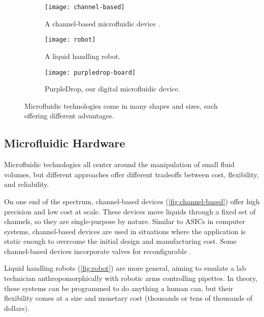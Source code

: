 \documentclass[sigconf, screen]{acmart}
\begin{document}
\begin{figure}
  \centering
  \begin{subfigure}[b]{0.3\linewidth}
    \centering
    \texttt{[image: channel-based]}
    \caption{
      \footnotesize
      A channel-based microfluidic device \cite{channel-img}.
    }
    \label{fig:channel-based}
  \end{subfigure}
  \hfill
  \begin{subfigure}[b]{0.3\linewidth}
    \centering
    \texttt{[image: robot]}
    \caption{
      \footnotesize
      A liquid handling robot.
      \cite{robot-img}
    }
    \label{fig:robot}
  \end{subfigure}
  \hfill
  \begin{subfigure}[b]{0.3\linewidth}
    \centering
    \texttt{[image: purpledrop-board]}
    \caption{
      \footnotesize
      PurpleDrop, our digital microfluidic device.
    }
    \label{fig:purpledrop-dmf}
  \end{subfigure}

  \caption{
    Microfluidic technologies come in many shapes and sizes, each offering different advantages.
  }
  \label{fig:microfluidic-types}
\end{figure}

\subsection{Microfluidic Hardware}

Microfluidic technologies all center around the manipulation of small fluid volumes, but different approaches offer different tradeoffs between cost, flexibility, and reliability.

On one end of the spectrum, channel-based devices (\autoref{fig:channel-based}) offer high precision and low cost at scale.
These devices move liquids through a fixed set of channels, so they are single-purpose by nature.
Similar to ASICs in computer systems, channel-based devices are used in situations where the application is static enough to overcome the initial design and manufacturing cost.
Some channel-based devices incorporate valves for reconfigurable \cite{amin2007aquacore}.

Liquid handling robots (\autoref{fig:robot}) are more general, aiming to emulate a lab technician anthropomorphically with robotic arms controlling pipettes.
In theory, these systems can be programmed to do anything a human can, but their flexibility comes at a size and monetary cost (thousands or tens of thousands of dollars).
\end{document}
